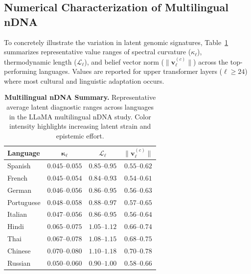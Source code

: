 \subsection{Numerical Characterization of Multilingual nDNA}
To concretely illustrate the variation in latent genomic signatures, Table~\ref{tab:multilingual_ndna_summary} summarizes representative value ranges of spectral curvature ($\kappa_\ell$), thermodynamic length ($\mathcal{L}_\ell$), and belief vector norm ($\|\mathbf{v}_\ell^{(c)}\|$) across the top-performing languages. Values are reported for upper transformer layers ($\ell \geq 24$) where most cultural and linguistic adaptation occurs.

\begin{table}[H]
\centering
\caption{
\textbf{Multilingual nDNA Summary.}
Representative average latent diagnostic ranges across languages in the LLaMA multilingual nDNA study. Color intensity highlights increasing latent strain and epistemic effort.
}
\begin{tabular}{|l|c|c|c|}
\hline
\textbf{Language} & $\boldsymbol{\kappa_\ell}$ & $\boldsymbol{\mathcal{L}_\ell}$ & $\|\mathbf{v}_\ell^{(c)}\|$ \\
\hline
Spanish     & \cellcolor{green!15}$0.045$–$0.055$ & \cellcolor{green!15}$0.85$–$0.95$ & \cellcolor{green!15}$0.55$–$0.62$ \\
French      & \cellcolor{green!15}$0.045$–$0.054$ & \cellcolor{green!15}$0.84$–$0.93$ & \cellcolor{green!15}$0.54$–$0.61$ \\
German      & \cellcolor{green!20}$0.046$–$0.056$ & \cellcolor{green!20}$0.86$–$0.95$ & \cellcolor{green!20}$0.56$–$0.63$ \\
Portuguese  & \cellcolor{yellow!20}$0.048$–$0.058$ & \cellcolor{yellow!20}$0.88$–$0.97$ & \cellcolor{yellow!20}$0.57$–$0.65$ \\
Italian     & \cellcolor{yellow!20}$0.047$–$0.056$ & \cellcolor{yellow!20}$0.86$–$0.95$ & \cellcolor{yellow!20}$0.56$–$0.64$ \\
Hindi       & \cellcolor{orange!30}$0.065$–$0.075$ & \cellcolor{orange!30}$1.05$–$1.12$ & \cellcolor{orange!30}$0.66$–$0.74$ \\
Thai        & \cellcolor{orange!30}$0.067$–$0.078$ & \cellcolor{orange!30}$1.08$–$1.15$ & \cellcolor{orange!30}$0.68$–$0.75$ \\
Chinese     & \cellcolor{red!30}$0.070$–$0.080$ & \cellcolor{red!30}$1.10$–$1.18$ & \cellcolor{red!30}$0.70$–$0.78$ \\
Russian     & \cellcolor{yellow!20}$0.050$–$0.060$ & \cellcolor{yellow!20}$0.90$–$1.00$ & \cellcolor{yellow!20}$0.58$–$0.66$ \\
\hline
\end{tabular}
\label{tab:multilingual_ndna_summary}
\end{table}



